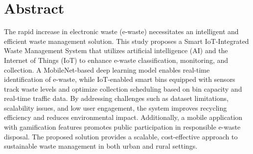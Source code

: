 \chapter*{Abstract}

The rapid increase in electronic waste (e-waste) necessitates an intelligent and efficient waste management solution. This study proposes a Smart IoT-Integrated Waste Management System that utilizes artificial intelligence (AI) and the Internet of Things (IoT) to enhance e-waste classification, monitoring, and collection. A MobileNet-based deep learning model enables real-time identification of e-waste, while IoT-enabled smart bins equipped with sensors track waste levels and optimize collection scheduling based on bin capacity and real-time traffic data. By addressing challenges such as dataset limitations, scalability issues, and low user engagement, the system improves recycling efficiency and reduces environmental impact. Additionally, a mobile application with gamification features promotes public participation in responsible e-waste disposal. The proposed solution provides a scalable, cost-effective approach to sustainable waste management in both urban and rural settings.
